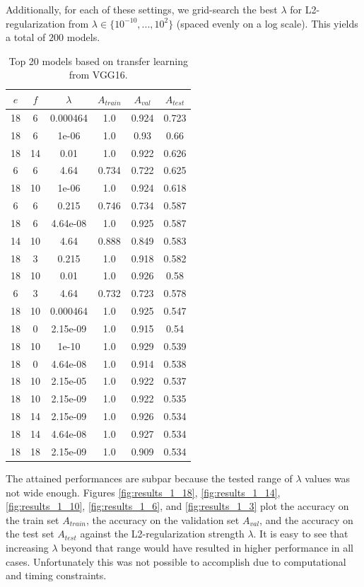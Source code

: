 Additionally, for each of these settings, we grid-search the best $\lambda$ for L2-regularization from $\lambda \in \{10^{-10}, ..., 10^{2}\}$ (spaced evenly on a log scale). This yields a total of $200$ models.

\begin{table}[ht]
\centering
\begin{tabular}{ |c|c|c|c|c|c| }
\hline
$e$ & $f$ & $\lambda$ & $A_{train}$ & $A_{val}$ & $A_{test}$ \\
\hline
18 & 6 & 0.000464 & 1.0 & 0.924 & 0.723 \\
18 & 6 & 1e-06 & 1.0 & 0.93 & 0.66 \\
18 & 14 & 0.01 & 1.0 & 0.922 & 0.626 \\
6 & 6 & 4.64 & 0.734 & 0.722 & 0.625 \\
18 & 10 & 1e-06 & 1.0 & 0.924 & 0.618 \\
6 & 6 & 0.215 & 0.746 & 0.734 & 0.587 \\
18 & 6 & 4.64e-08 & 1.0 & 0.925 & 0.587 \\
14 & 10 & 4.64 & 0.888 & 0.849 & 0.583 \\
18 & 3 & 0.215 & 1.0 & 0.918 & 0.582 \\
18 & 10 & 0.01 & 1.0 & 0.926 & 0.58 \\
6 & 3 & 4.64 & 0.732 & 0.723 & 0.578 \\
18 & 10 & 0.000464 & 1.0 & 0.925 & 0.547 \\
18 & 0 & 2.15e-09 & 1.0 & 0.915 & 0.54 \\
18 & 10 & 1e-10 & 1.0 & 0.929 & 0.539 \\
18 & 0 & 4.64e-08 & 1.0 & 0.914 & 0.538 \\
18 & 10 & 2.15e-05 & 1.0 & 0.922 & 0.537 \\
18 & 10 & 2.15e-09 & 1.0 & 0.922 & 0.535 \\
18 & 14 & 2.15e-09 & 1.0 & 0.926 & 0.534 \\
18 & 14 & 4.64e-08 & 1.0 & 0.927 & 0.534 \\
18 & 18 & 2.15e-09 & 1.0 & 0.909 & 0.534 \\
\hline
\end{tabular}
\caption{Top 20 models based on transfer learning from VGG16.}
\label{table:vgg16_top20}
\end{table}

The attained performances are subpar because the tested range of $\lambda$ values was not wide enough. Figures \ref{fig:results_1_18}, \ref{fig:results_1_14}, \ref{fig:results_1_10}, \ref{fig:results_1_6}, and \ref{fig:results_1_3} plot the accuracy on the train set $A_{train}$, the accuracy on the validation set $A_{val}$, and the accuracy on the test set $A_{test}$ against the L2-regularization strength $\lambda$. It is easy to see that increasing $\lambda$ beyond that range would have resulted in higher performance in all cases. Unfortunately this was not possible to accomplish due to computational and timing constraints.

